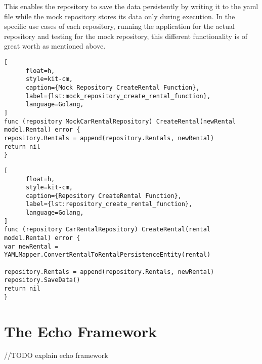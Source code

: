 This enables the repository to save the data persistently by writing it to the yaml file while the mock repository stores its data only during execution.
In the specific use cases of each repository, running the application for the actual repository and testing for the mock repository, this different functionality is of great worth as mentioned above.

\begin{lstlisting}[
      float=h,
      style=kit-cm,
      caption={Mock Repository CreateRental Function},
      label={lst:mock_repository_create_rental_function},
      language=Golang,
]
func (repository MockCarRentalRepository) CreateRental(newRental model.Rental) error {
repository.Rentals = append(repository.Rentals, newRental)
return nil
}
\end{lstlisting}

\begin{lstlisting}[
      float=h,
      style=kit-cm,
      caption={Repository CreateRental Function},
      label={lst:repository_create_rental_function},
      language=Golang,
]
func (repository CarRentalRepository) CreateRental(rental model.Rental) error {
var newRental = YAMLMapper.ConvertRentalToRentalPersistenceEntity(rental)

repository.Rentals = append(repository.Rentals, newRental)
repository.SaveData()
return nil
}
\end{lstlisting}

\section{The Echo Framework}
\label{sec:the_echo_framework}
//TODO explain echo framework